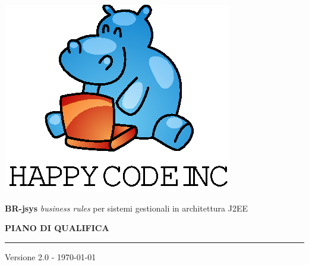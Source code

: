 \documentclass[11pt,titlepage,a4paper]{report}
\begin{document}
\newcommand{\lv}{2.0} %
\newcommand{\PianoDiProgetto}{ PianoDiProgetto.1.0.pdf }
\newcommand{\Glossario}{ Glossario.1.4.pdf }



\begin{titlepage}
\begin{center}
\vspace*{0.5in}
\includegraphics{logo.eps}
\vspace*{0.2in}

{\Large \textbf{BR-jsys}}
{\Large \emph{business rules} per sistemi gestionali in architettura J2EE } 
\vspace{2in}

\LARGE \textbf {PIANO DI QUALIFICA}
\par\rule{10cm}{0.4pt} \par {\large Versione 2.0 - \today}


\end{center}
\end{titlepage}
\vspace*{0.5in}
\end{document}
